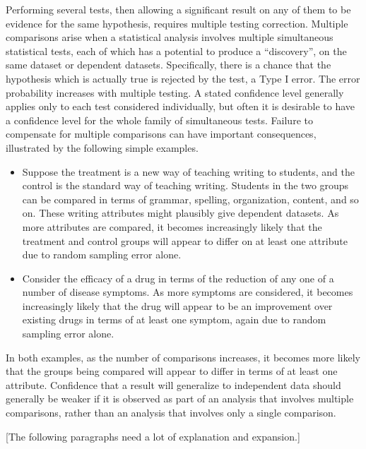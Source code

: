 \documentclass[12pt]{article}
\begin{document}
Performing several tests, then allowing a significant result on any of
them to be evidence for the same hypothesis, requires multiple testing
correction.  Multiple comparisons%
arise when a statistical analysis involves multiple simultaneous
statistical tests, each of which has a potential to produce a
``discovery'', on the same dataset or dependent datasets.  Specifically,
there is a chance that the hypothesis which is actually true is rejected
by the test, a Type I error.  The error probability increases with
multiple testing.  A stated confidence level generally applies only to
each test considered individually, but often it is desirable to have a
confidence level for the whole family of simultaneous tests.  Failure to
compensate for multiple comparisons can have important consequences,
illustrated by the following simple examples.
\begin{itemize}
    \item
        Suppose the treatment is a new way of teaching writing to
        students, and the control is the standard way of teaching
        writing.  Students in the two groups can be compared in terms of
        grammar, spelling, organization, content, and so on.  These
        writing attributes might plausibly give dependent datasets.  As
        more attributes are compared, it becomes increasingly likely
        that the treatment and control groups will appear to differ on
        at least one attribute due to random sampling error alone.
    \item
        Consider the efficacy of a drug in terms of the reduction of any
        one of a number of disease symptoms.  As more symptoms are
        considered, it becomes increasingly likely that the drug will
        appear to be an improvement over existing drugs in terms of at
        least one symptom, again due to random sampling error alone.
\end{itemize}
In both examples, as the number of comparisons increases, it becomes
more likely that the groups being compared will appear to differ in
terms of at least one attribute.  Confidence that a result will
generalize to independent data should generally be weaker if it is
observed as part of an analysis that involves multiple comparisons,
rather than an analysis that involves only a single comparison.

[The following paragraphs need a lot of explanation and expansion.]
\end{document}
